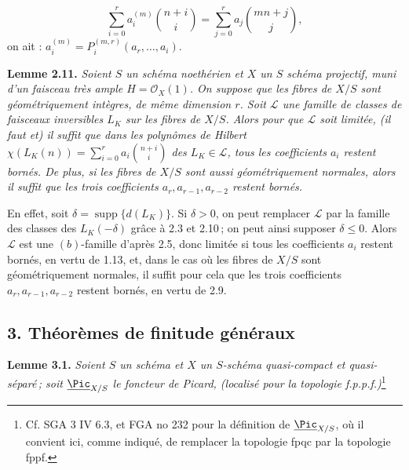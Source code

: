 \[
\sum_{i=0}^{r}a_i^{(m)}\binom{n+i}{i}
=
\sum_{j=0}^{r}a_j\binom{mn+j}{j},
\]
on ait : \(a_i^{(m)}=P_i^{(m,r)}(a_r,\ldots,a_i)\).

\textbf{Lemme 2.11.} \emph{Soient \(S\) un schéma noethérien et \(X\) un \(S\) schéma projectif, muni d'un faisceau très ample \(H=\mathcal O_X(1)\). On suppose que les fibres de \(X/S\) sont géométriquement intègres, de même dimension \(r\). Soit \(\mathcal L\) une famille de classes de faisceaux inversibles \(L_K\) sur les fibres de \(X/S\). Alors pour que \(\mathcal L\) soit limitée, (il faut et) il suffit que dans les polynômes de Hilbert \(\chi(L_K(n))=\sum_{i=0}^{r}a_i\binom{n+i}{i}\) des \(L_K\in\mathcal L\), tous les coefficients \(a_i\) restent bornés. De plus, si les fibres de \(X/S\) sont aussi géométriquement normales, alors il suffit que les trois coefficients \(a_r,a_{r-1},a_{r-2}\) restent bornés.}

En effet, soit \(\delta=\operatorname{supp}\{d(L_K)\}\). Si \(\delta>0\), on peut remplacer \(\mathcal L\) par la famille des classes des \(L_K(-\delta)\) grâce à 2.3 et 2.10\,; on peut ainsi supposer \(\delta\le0\). Alors \(\mathcal L\) est une \((b)\)-famille d'après 2.5, donc limitée si tous les coefficients \(a_i\) restent bornés, en vertu de 1.13, et, dans le cas où les fibres de \(X/S\) sont géométriquement normales, il suffit pour cela que les trois coefficients \(a_r,a_{r-1},a_{r-2}\) restent bornés, en vertu de 2.9.

\subsection*{3. Théorèmes de finitude généraux}
\textbf{Lemme 3.1.} \emph{Soient \(S\) un sch\'ema et \(X\) un \(S\)-sch\'ema quasi-compact et quasi-s\'epar\'e\,; soit \(\underline{\Pic}_{X/S}\) le foncteur de Picard, (localis\'e pour la topologie f.p.p.f.)}\footnote{Cf. SGA 3 IV 6.3, et FGA no 232 pour la d\'efinition de \(\underline{\Pic}_{X/S}\), o\`u il convient ici, comme indiqu\'e, de remplacer la topologie fpqc par la topologie fppf.}
